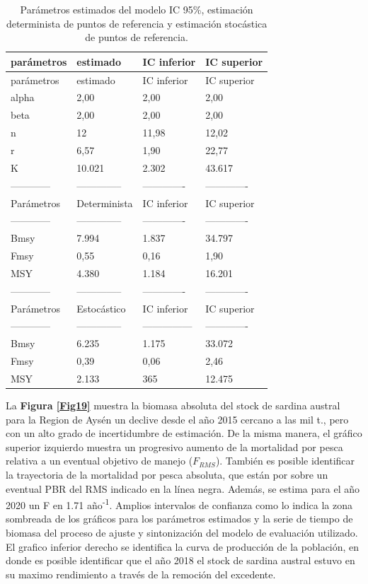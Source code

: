 \documentclass[
  spanish,
]{article}
\begin{document}
\small

\begin{longtable}[]{@{}llll@{}}
\caption{\label{Tab13} Parámetros estimados del modelo IC 95\%,
estimación determinista de puntos de referencia y estimación stocástica
de puntos de referencia. \normalsize}\tabularnewline
\toprule
parámetros & estimado & IC inferior & IC superior\tabularnewline
\midrule
\endfirsthead
\toprule
parámetros & estimado & IC inferior & IC superior\tabularnewline
\midrule
\endhead
alpha & 2,00 & 2,00 & 2,00\tabularnewline
beta & 2,00 & 2,00 & 2,00\tabularnewline
n & 12 & 11,98 & 12,02\tabularnewline
r & 6,57 & 1,90 & 22,77\tabularnewline
K & 10.021 & 2.302 & 43.617\tabularnewline
------------ & -------------- & ------------- &
-------------\tabularnewline
Parámetros & Determinista & IC inferior & IC superior\tabularnewline
------------ & -------------- & ------------- &
-------------\tabularnewline
Bmsy & 7.994 & 1.837 & 34.797\tabularnewline
Fmsy & 0,55 & 0,16 & 1,90\tabularnewline
MSY & 4.380 & 1.184 & 16.201\tabularnewline
------------ & -------------- & ------------- &
-------------\tabularnewline
Parámetros & Estocástico & IC inferior & IC superior\tabularnewline
------------ & -------------- & --------------- &
-------------\tabularnewline
Bmsy & 6.235 & 1.175 & 33.072\tabularnewline
Fmsy & 0,39 & 0,06 & 2,46\tabularnewline
MSY & 2.133 & 365 & 12.475\tabularnewline
\bottomrule
\end{longtable}

\normalsize

La \textbf{Figura \ref{Fig19}} muestra la biomasa absoluta del stock de
sardina austral para la Region de Aysén un declive desde el año 2015
cercano a las mil t., pero con un alto grado de incertidumbre de
estimación. De la misma manera, el gráfico superior izquierdo muestra un
progresivo aumento de la mortalidad por pesca relativa a un eventual
objetivo de manejo (\(F_{RMS}\)). También es posible identificar la
trayectoria de la mortalidad por pesca absoluta, que están por sobre un
eventual PBR del RMS indicado en la línea negra. Además, se estima para
el año 2020 un F en 1.71 año\textsuperscript{-1}. Amplios intervalos de
confianza como lo indica la zona sombreada de los gráficos para los
parámetros estimados y la serie de tiempo de biomasa del proceso de
ajuste y sintonización del modelo de evaluación utilizado. El grafico
inferior derecho se identifica la curva de producción de la población,
en donde es posible identificar que el año 2018 el stock de sardina
austral estuvo en su maximo rendimiento a través de la remoción del
excedente.
\end{document}
